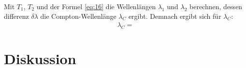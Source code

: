     Mit $T_1$, $T_2$ und der Formel \eqref{eq:16} die Wellenlängen $\lambda_1$ und $\lambda_2$ berechnen, dessen differenz $\delta \lambda$ die Compton-Wellenlänge $\lambda_C$ ergibt.
    Demnach ergibt sich für $\lambda_C$:
    \begin{align}
        \lambda_C = \text{} \label{eq:20}
    \end{align}



\section{Diskussion}

\newpage
\printbibliography

